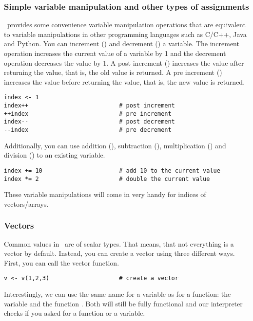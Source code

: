 \subsubsection{Simple variable manipulation and other types of assignments}
\Rev~provides some convenience variable manipulation operations that are equivalent to variable manipulations in other programming languages such as C/C++, Java and Python.
You can increment (\cl{++}) and decrement (\cl{--}) a variable.
The increment operation increases the current value of a variable by 1 and the decrement operation decreases the value by 1.
A post increment () increases the value after returning the value, that is, the old value is returned.
A pre increment () increases the value before returning the value, that is, the new value is returned.
{\tt \begin{snugshade*}
\begin{lstlisting}    
index <- 1
index++                          # post increment
++index                          # pre increment
index--                          # post decrement
--index                          # pre decrement
\end{lstlisting}
\end{snugshade*}}
Additionally, you can use addition (), subtraction (), multiplication () and division () to an existing variable.
{\tt \begin{snugshade*}
\begin{lstlisting}    
index += 10                      # add 10 to the current value
index *= 2                       # double the current value
\end{lstlisting}
\end{snugshade*}}
These variable manipulations will come in very handy for indices of vectors/arrays.

\subsubsection{Vectors}
Common values in \RevBayes~are of scalar types.
That means, that not everything is a vector by default.
Instead, you can create a vector using three different ways.
First, you can call the vector function.
{\tt \begin{snugshade*}
\begin{lstlisting}    
v <- v(1,2,3)                    # create a vector
\end{lstlisting}
\end{snugshade*}}
Interestingly, we can use the same name for a variable as for a function: the variable  and the function .
Both will still be fully functional and our interpreter checks if you asked for a function or a variable.

